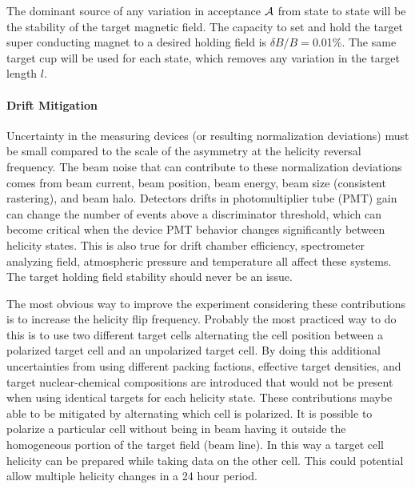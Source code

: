 The dominant source of any variation in acceptance ${\cal A}$ from state to state will be the stability of the target magnetic field.
The capacity to set and hold the target super conducting magnet
to a desired holding field is $\delta B /B=$0.01\%.  The same target cup will be used
for each state, which removes any variation in the target length $l$. 

\paragraph{Drift Mitigation }\mbox{}

Uncertainty in the measuring devices (or resulting normalization deviations) must be small compared to the
scale of the asymmetry at the helicity reversal frequency.  The beam noise that can contribute to these
normalization deviations comes from beam current, beam position, beam energy, beam size (consistent rastering), and beam halo.  Detectors drifts in photomultiplier tube (PMT) gain can change the number of events above
a discriminator threshold, which can become critical when the device PMT behavior changes significantly between
helicity states.  This is also true for drift chamber efficiency, spectrometer analyzing field,
atmospheric pressure and temperature all affect these systems.
The target holding field stability should never be an issue.%

The most obvious way to improve the experiment considering these contributions is to increase the helicity flip frequency.
Probably the most practiced way to do this is to use two different target cells alternating the cell position between a
polarized target cell and an unpolarized target cell.  By doing this additional uncertainties from using different packing factions,
effective target densities, and target nuclear-chemical compositions are introduced that would not be present when using identical targets for each helicity state.
These contributions maybe able to be mitigated by alternating which cell is polarized.  It is possible to polarize a particular cell
without being in beam having it outside the homogeneous portion of the target field (beam line).  In this way a target cell helicity can be
prepared while taking data on the other cell.  This could potential allow multiple helicity changes in a 24 hour period.

